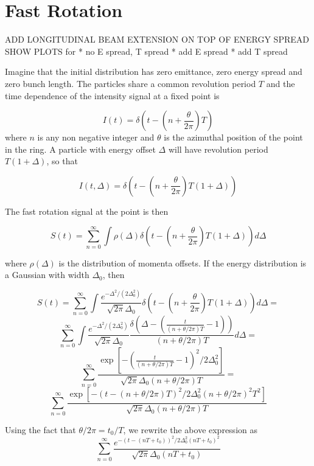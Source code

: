 \section{Fast Rotation}

ADD LONGITUDINAL BEAM EXTENSION ON TOP OF ENERGY SPREAD \newline
SHOW PLOTS for\newline
  * no  E spread, T spread\newline
  * add E spread\newline
  * add T spread\newline

Imagine that the initial distribution has zero emittance, zero energy spread and zero bunch length. The particles share a common revolution period $T$ and the time dependence of the intensity signal at a fixed point is 

\begin{equation}
I(t)=\delta\left(t-\left(n+\frac{\theta}{2\pi}\right)T\right)
\end{equation} 
where $n$ is any non negative integer and $\theta$ is the azimuthal position of the point in the ring. A particle with energy offset $\Delta$ will have revolution period $T(1+\Delta)$, so that 

\begin{equation}
I(t,\Delta)=\delta\left(t-\left(n+\frac{\theta}{2\pi}\right)T\left(1+\Delta\right)\right) 
\end{equation}

The fast rotation signal at the point is then 

\begin{equation}
S(t)=\sum^{\infty}_{n=0}\int\rho(\Delta)\delta\left(t-\left(n+\frac{\theta}{2\pi}\right)T\left(1+\Delta\right)\right)d\Delta 
\end{equation}

where $\rho(\Delta)$ is the distribution of momenta offsets. If the energy distribution is a Gaussian with width $\Delta_0$, then 

\[S(t) =\sum^{\infty}_{n=0}\int\frac{e^{-\Delta^2/(2\Delta^2_0)}}{\sqrt{2\pi}\Delta_0}\delta\left(t-\left(n+\frac{\theta}{2\pi}\right)T\left(1+\Delta\right)\right)d\Delta=\]\[\sum^{\infty}_{n=0}\int\frac{e^{-\Delta^2/(2\Delta^2_0)}}{\sqrt{2\pi}\Delta_0}\frac{\delta\left(\Delta-\left(\frac{t}{(n+\theta/2\pi)T}-1\right)\right)}{(n+\theta/2\pi)T}d\Delta=\]\[\sum^{\infty}_{n=0}\frac{\exp[-(\frac{t}{(n+\theta/2\pi)T}-1)^2/2\Delta^2_0]}{\sqrt{2\pi}\Delta_0(n+\theta/2\pi)T}=\]\[\sum^{\infty}_{n=0}\frac{\exp[-(t-(n+\theta/2\pi)T)^2/2\Delta^2_0(n+\theta/2\pi)^2T^2]}{\sqrt{2\pi}\Delta_0(n+\theta/2\pi)T}\]


Using the fact that $\theta/2\pi=t_0/T$, we rewrite the above expression as 
\begin{equation}
\sum^{\infty}_{n=0}\frac{e^{-(t-(nT+t_0))^2/2\Delta^2_0(nT+t_0)^2}}{\sqrt{2\pi}\Delta_0(nT+t_0)}
\end{equation}
